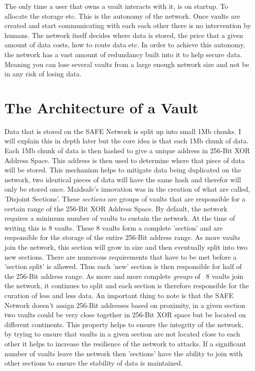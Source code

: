 \documentclass{l4proj}
\begin{document}
The only time a user that owns a vault interacts with it, is on startup. To allocate the storage etc. This is the autonomy of the network. Once vaults are created and start communicating with each each other there is no intervention by humans. The network itself decides where data is stored, the price that a given amount of data costs, how to route data etc. In order to achieve this autonomy, the network has a vast amount of redundancy built into it to help secure data. Meaning you can lose several vaults from a large enough network size and not be in any risk of losing data.

\section{The Architecture of a Vault}

Data that is stored on the SAFE Network is split up into small 1Mb chunks. I will explain this in depth later but the core idea is that each 1Mb chunk of data. Each 1Mb chunk of data is then hashed to give a unique address in 256-Bit XOR Address Space. This address is then used to determine where that piece of data will be stored. This mechanism helps to mitigate data being duplicated on the network, two identical pieces of data will have the same hash and therefor will only be stored once. Maidsafe's innovation was in the creation of what are called, 'Disjoint Sections'. These \textit{sections} are groups of vaults that are responsible for a certain range of the 256-Bit XOR Address Space. By default, the network requires a minimum number of vaults to sustain the network. At the time of writing this is 8 vaults. These 8 vaults form a complete 'section' and are responsible for the storage of the entire 256-Bit address range. As more vaults join the network, this section will grow in size and then eventually split into two new sections. There are numerous requirements that have to be met before a 'section split' is allowed. Thus each 'new' section is then responsible for half of the 256-Bit address range. As more and more complete \textit{groups} of ~8 vaults join the network, it continues to split and each section is therefore responsible for the curation of less and less data. An important thing to note is that the SAFE Network doesn't assign 256-Bit addresses based on proximity, in a given section two vaults could be very close together in 256-Bit XOR space but be located on different continents. This property helps to ensure the integrity of the network, by trying to ensure that vaults in a given section are not located close to each other it helps to increase the resilience of the network to attacks. If a significant number of vaults leave the network then 'sections' have the ability to join with other sections to ensure the stability of data is maintained.
\end{document}
